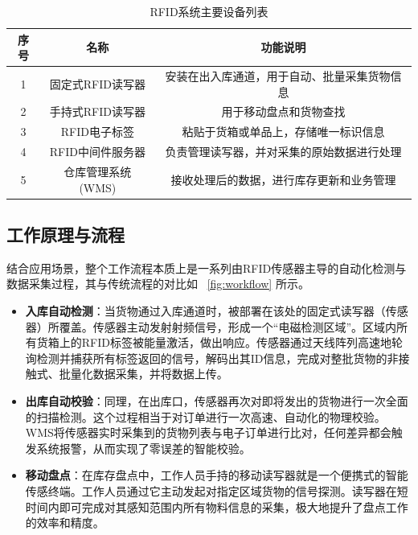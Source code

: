 \documentclass[a4paper, 12pt]{article}
\begin{document}
\begin{table}[H]
    \centering
    \setlength{\belowcaptionskip}{0.3cm}
    \caption{RFID系统主要设备列表}
    \label{tab:equipment_list}
    \begin{tabular}{c c c}
        \toprule
        \textbf{序号} & \textbf{名称} & \textbf{功能说明} \\
        \midrule
        1 & 固定式RFID读写器 & 安装在出入库通道，用于自动、批量采集货物信息 \\
        2 & 手持式RFID读写器 & 用于移动盘点和货物查找 \\
        3 & RFID电子标签 & 粘贴于货箱或单品上，存储唯一标识信息 \\
        4 & RFID中间件服务器 & 负责管理读写器，并对采集的原始数据进行处理 \\
        5 & 仓库管理系统(WMS) & 接收处理后的数据，进行库存更新和业务管理 \\
        \bottomrule
    \end{tabular}
\end{table}

\subsection{工作原理与流程}

结合应用场景，整个工作流程本质上是一系列由RFID传感器主导的自动化检测与数据采集过程，其与传统流程的对比如 \figurename~\ref{fig:workflow} 所示。

\begin{itemize}
    \item \textbf{入库自动检测}：当货物通过入库通道时，被部署在该处的固定式读写器（传感器）所覆盖。传感器主动发射射频信号，形成一个“电磁检测区域”。区域内所有货箱上的RFID标签被能量激活，做出响应。传感器通过天线阵列高速地轮询检测并捕获所有标签返回的信号，解码出其ID信息，完成对整批货物的非接触式、批量化数据采集，并将数据上传\cite{ref3}。
    \item \textbf{出库自动校验}：同理，在出库口，传感器再次对即将发出的货物进行一次全面的扫描检测。这个过程相当于对订单进行一次高速、自动化的物理校验。WMS将传感器实时采集到的货物列表与电子订单进行比对，任何差异都会触发系统报警，从而实现了零误差的智能校验。
    \item \textbf{移动盘点}：在库存盘点中，工作人员手持的移动读写器就是一个便携式的智能传感终端。工作人员通过它主动发起对指定区域货物的信号探测。读写器在短时间内即可完成对其感知范围内所有物料信息的采集，极大地提升了盘点工作的效率和精度\cite{ref4}。
\end{itemize}
\end{document}
